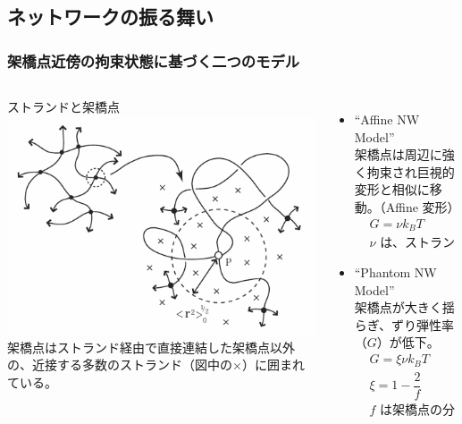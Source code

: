 \documentclass[12pt, dvipdfmx]{beamer}
\begin{document}
\subsection{ネットワークの振る舞い}
\begin{frame}
	\frametitle{架橋点近傍の拘束状態に基づく二つのモデル}
		\begin{columns}[totalwidth=1\textwidth]
				\begin{block}{ストランドと架橋点}
					\includegraphics[width=\textwidth]{JP_vicinity.png}
					架橋点はストランド経由で直接連結した架橋点以外の、近接する多数のストランド（図中の×）に囲まれている。
				\end{block}
			\begin{itemize}
				\item ``Affine NW Model''\\
					架橋点は周辺に強く拘束され巨視的変形と相似に移動。（Affine 変形）
					\footnotesize
					\begin{align*}
						&G=\nu k_B T \\
						&\text{$\nu$ は、ストランドの数密度}
					\end{align*}
					\normalsize
				\item ``Phantom NW Model''\\
					架橋点が大きく揺らぎ、ずり弾性率（$G$）が低下。
					\footnotesize
					\begin{align*}
						&G=\xi \nu k_B T \\
						&\xi= 1 -\dfrac{2}{f}\\
						&\text{$f$ は架橋点の分岐数}
					\end{align*}
			\end{itemize}
		\end{columns}
\end{frame}
\end{document}
